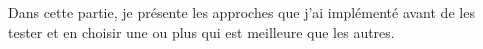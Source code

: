 Dans cette partie, je présente les approches que j'ai implémenté avant de les tester et en choisir une ou plus qui est meilleure que les autres.
